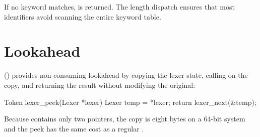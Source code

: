 \pnum
If no keyword matches,  is returned.  The length
dispatch ensures that most identifiers avoid scanning the entire keyword table.

\section{Lookahead}
\label{sec:lex-peek}

\pnum
{} () provides
non-consuming lookahead by copying the lexer state, calling 
on the copy, and returning the result without modifying the original:

\begin{ccode}
Token lexer_peek(Lexer *lexer) {
    Lexer temp = *lexer;
    return lexer_next(&temp);
}
\end{ccode}

Because  contains only two pointers, the copy is eight bytes on a
64-bit system and the peek has the same cost as a regular .

